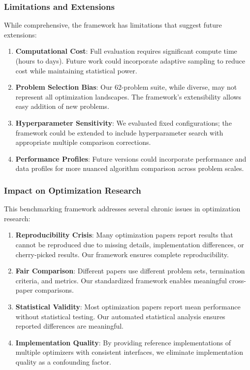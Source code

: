 \hypertarget{limitations-and-extensions}{%
\subsubsection{Limitations and Extensions}\label{limitations-and-extensions}}

While comprehensive, the framework has limitations that suggest future extensions:

\begin{enumerate}
\def\labelenumi{\arabic{enumi}.}
\tightlist
\item
  \textbf{Computational Cost}: Full evaluation requires significant compute time (hours to days). Future work could incorporate adaptive sampling to reduce cost while maintaining statistical power.
\item
  \textbf{Problem Selection Bias}: Our 62-problem suite, while diverse, may not represent all optimization landscapes. The framework's extensibility allows easy addition of new problems.
\item
  \textbf{Hyperparameter Sensitivity}: We evaluated fixed configurations; the framework could be extended to include hyperparameter search with appropriate multiple comparison corrections.
\item
  \textbf{Performance Profiles}: Future versions could incorporate performance and data profiles for more nuanced algorithm comparison across problem scales.
\end{enumerate}

\hypertarget{impact-on-optimization-research}{%
\subsubsection{Impact on Optimization Research}\label{impact-on-optimization-research}}

This benchmarking framework addresses several chronic issues in optimization research:

\begin{enumerate}
\def\labelenumi{\arabic{enumi}.}
\tightlist
\item
  \textbf{Reproducibility Crisis}: Many optimization papers report results that cannot be reproduced due to missing details, implementation differences, or cherry-picked results. Our framework ensures complete reproducibility.
\item
  \textbf{Fair Comparison}: Different papers use different problem sets, termination criteria, and metrics. Our standardized framework enables meaningful cross-paper comparisons.
\item
  \textbf{Statistical Validity}: Most optimization papers report mean performance without statistical testing. Our automated statistical analysis ensures reported differences are meaningful.
\item
  \textbf{Implementation Quality}: By providing reference implementations of multiple optimizers with consistent interfaces, we eliminate implementation quality as a confounding factor.
\end{enumerate}

